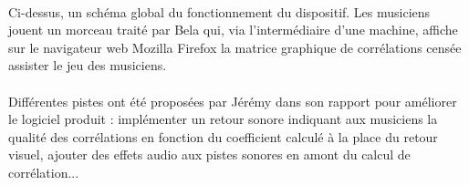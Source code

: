 \paragraph{}
Ci-dessus, un schéma global du fonctionnement du dispositif. Les
musiciens jouent un morceau traité par Bela qui, via l'intermédiaire
d'une machine, affiche sur le navigateur web Mozilla Firefox la
matrice graphique de corrélations censée assister le jeu des
musiciens.

\paragraph{}
Différentes pistes ont été proposées par Jérémy dans son rapport pour
améliorer le logiciel produit : implémenter un retour sonore indiquant
aux musiciens la qualité des corrélations en fonction du coefficient
calculé à la place du retour visuel, ajouter des effets audio aux
pistes sonores en amont du calcul de corrélation...

